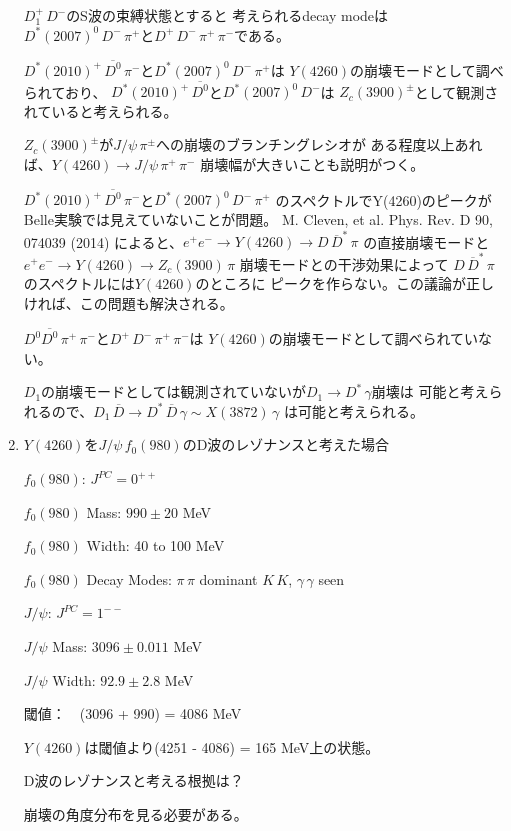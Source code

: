 \documentclass[a4j]{jarticle}
\begin{document}
\begin{enumerate}
$D_1^+ \, D^-$のS波の束縛状態とすると
考えられるdecay modeは$D^\ast(2007)^0 \, D^- \, \pi^+$と$D^+ \, D^- \, \pi^+ \, \pi^-$である。

$D^\ast(2010)^+ \, \overline{D^0} \, \pi^-$と$D^\ast(2007)^0 \, D^- \, \pi^+$は
$Y(4260)$の崩壊モードとして調べられており、
$D^\ast(2010)^+ \, \overline{D^0}$と$D^\ast(2007)^0 \, D^-$は
$Z_c(3900)^\pm$として観測されていると考えられる。

$Z_c(3900)^\pm$が$J/\psi \, \pi^\pm$への崩壊のブランチングレシオが
ある程度以上あれば、$Y(4260) \to J/\psi \, \pi^+ \, \pi^-$
崩壊幅が大きいことも説明がつく。

$D^\ast(2010)^+ \, \overline{D^0} \, \pi^-$と$D^\ast(2007)^0 \, D^- \, \pi^+$
のスペクトルでY(4260)のピークがBelle実験では見えていないことが問題。
M. Cleven, et al. Phys. Rev. D 90, 074039 (2014)
によると、$e^+ e^- \to Y(4260) \to D \, \overline{D}^\ast \, \pi$
の直接崩壊モードと$e^+ e^- \to Y(4260) \to Z_c(3900) \, \pi$
崩壊モードとの干渉効果によって
$D \, \overline{D}^\ast \, \pi$のスペクトルには$Y(4260)$のところに
ピークを作らない。この議論が正しければ、この問題も解決される。


$D^0 \overline{D^0} \, \pi^+ \, \pi^-$と$D^+ \, D^- \, \pi^+ \, \pi^-$は
$Y(4260)$の崩壊モードとして調べられていない。


$D_1$の崩壊モードとしては観測されていないが$D_1 \to D^\ast \, \gamma$崩壊は
可能と考えられるので、$D_1 \, \overline{D} \to D^\ast \, \overline{D}　\, \gamma \sim X(3872) \, \gamma$
は可能と考えられる。

\vspace*{5mm}
\item

$Y(4260)$を$J/\psi \, f_0(980)$のD波のレゾナンスと考えた場合

\vspace*{5mm}

$f_0(980)$:  $J^{PC} = 0^{++}$

$f_0(980)$ Mass:  $990 \pm 20$ MeV

$f_0(980)$ Width:  40 to 100 MeV

$f_0(980)$ Decay Modes: $\pi \, \pi$ dominant  $K \, K$, $\gamma \, \gamma$ seen

\vspace*{5mm}

$J/\psi$:  $J^{PC} = 1^{--}$

$J/\psi$ Mass:  $3096 \pm 0.011$ MeV

$J/\psi$ Width:  $92.9 \pm 2.8$ MeV

閾値：　(3096 + 990) =  4086 MeV

$Y(4260)$は閾値より(4251 - 4086) = 165 MeV上の状態。

D波のレゾナンスと考える根拠は？

崩壊の角度分布を見る必要がある。

\end{enumerate}
\end{document}
